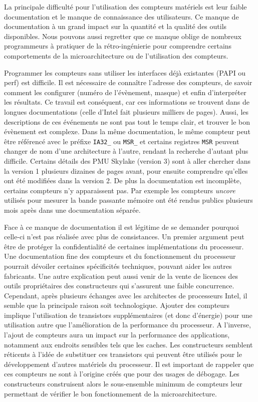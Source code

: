         La principale difficulté pour l'utilisation des compteurs matériels est leur faible documentation et le manque de connaissance des utilisateurs. Ce manque de documentation à un grand impact sur la quantité et la qualité des outils disponibles. Nous pouvons aussi regretter que ce manque oblige de nombreux programmeurs à pratiquer de la rétro-ingénierie pour comprendre certains comportements de la microarchitecture ou de l'utilisation des compteurs.

        Programmer les compteurs sans utiliser les interfaces déjà existantes (PAPI ou perf) est difficile. Il est nécessaire de connaître l'adresse des compteurs, de savoir comment les configurer (numéro de l'évènement, masque) et enfin d'interpréter les résultats. Ce travail est conséquent, car ces informations se trouvent dans de longues documentations (celle d'Intel fait plusieurs milliers de pages). Aussi, les descriptions de ces événements ne sont pas tout le temps clair, et trouver le bon évènement est complexe. Dans la même documentation, le même compteur peut être référencé avec le préfixe \verb=IA32_= ou \verb=MSR_= et certains registres \verb|MSR| peuvent changer de nom d'une architecture à l'autre, rendant la recherche d'autant plus difficile. Certains détails des PMU Skylake (version 3) sont à aller chercher dans la version 1 plusieurs dizaines de pages avant, pour ensuite comprendre qu'elles ont été modifiées dans la version 2. De plus la documentation est incomplète, certains compteurs n'y apparaissent pas. Par exemple les compteurs \textit{uncore} utilisés pour mesurer la bande passante mémoire ont été rendus publics plusieurs mois après dans une documentation séparée.
  
        Face à ce manque de documentation il est légitime de se demander pourquoi celle-ci n'est pas réalisée avec plus de consistances. Un premier argument  peut être de protéger la confidentialité de certaines implémentations du processeur. Une documentation fine des compteurs et du fonctionnement du processeur pourrait dévoiler certaines spécificités techniques, pouvant aider les autres fabricants. 
        Une autre explication peut aussi venir de la vente de licences des outils propriétaires des constructeurs qui s'assurent une faible concurrence. Cependant, après plusieurs échanges avec les architectes de processeurs Intel, il semble que la principale raison soit technologique. Ajouter des compteurs implique l'utilisation de transistors supplémentaires (et donc d'énergie) pour une utilisation autre que l'amélioration de la performance du processeur. A l'inverse, l'ajout de compteurs aura un impact sur la performance des applications, notamment aux endroits sensibles tels que les caches. Les constructeurs semblent réticents à l'idée de substituer ces transistors qui peuvent être utilisés pour le développement d'autres matériels du processeur. Il est important de rappeler que ces compteurs ne sont à l'origine créés que pour des usages de débogage. Les constructeurs construisent alors le sous-ensemble minimum de compteurs leur permettant de vérifier le bon fonctionnement de la microarchitecture.
        
